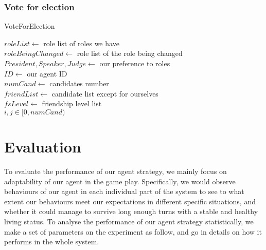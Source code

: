 \subsubsection{Vote for election}
\begin{algorithm}[H]
\caption{VoteForElection} 
    $roleList \gets$ role list of roles we have\\
    $roleBeingChanged \gets$ role list of the role being changed\\
    ${President, Speaker, Judge} \gets$ our preference to roles \\
    $ID \gets$ our agent ID\\
    $numCand \gets$ candidates number\\
    $friendList \gets$ candidate list except for ourselves\\
    $fsLevel \gets$ friendship level list\\
    $i, j \in [0, numCand)$\\
\end{algorithm}

\section{Evaluation} \label{sec:Team6_Evaluation}
To evaluate the performance of our agent strategy, we mainly focus on adaptability of our agent in the game play. Specifically, we would observe behaviours of our agent in each individual part of the system to see to what extent our behaviours meet our expectations in different specific situations, and whether it could manage to survive long enough turns with a stable and healthy living status. To analyse the performance of our agent strategy statistically, we make a set of parameters on the experiment as follow, and go in details on how it performs in the whole system.

